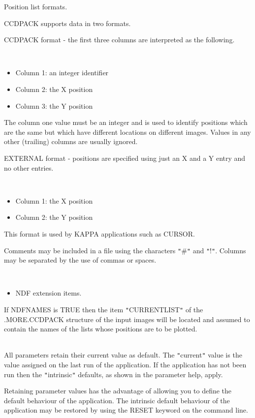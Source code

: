 \documentclass[twoside,11pt]{article}
\newcommand{\xref}[3]{#1}
\renewcommand{\_}{\texttt{\symbol{95}}}
\newcommand{\qt}[1]{{\tt "}#1{\tt "}}
\newcommand{\sstdiytopic}[2]{\item[#1:] \mbox{} \\[1.3ex] #2}
\newcommand{\sstitemlist}[1]{
  \mbox{} \\
  \vspace{-3.5ex}
  \begin{itemize}
     #1
  \end{itemize}
}
\newcommand{\sstitem}{\item}
\newcommand{\sstdiytopic}[2]{\item[{#1}] #2 }
\newcommand{\sstitemlist}[1]{
      \begin{itemize}
         #1
      \end{itemize}
      \\
   }
\newcommand{\sstitem}{\item}
\begin{document}
{{{         \sstitem
             Position list formats.

             CCDPACK supports data in two formats.

             CCDPACK format - the first three columns are interpreted as the
             following.

             \sstitemlist{

                \sstitem
                  Column 1: an integer identifier

                \sstitem
                  Column 2: the X position

                \sstitem
                  Column 3: the Y position
             }
             The column one value must be an integer and is used to identify
             positions which are the same but which have different locations
             on different images. Values in any other (trailing) columns are
             usually ignored.

             EXTERNAL format - positions are specified using just an X and
             a Y entry and no other entries.
             \sstitemlist{

                \sstitem
                  Column 1: the X position

                \sstitem
                  Column 2: the Y position

            }
            This format is used by KAPPA applications such as
            \xref{CURSOR}{sun95}{CURSOR}.

            Comments may be included in a file using the characters \qt{\#} and
            \qt{!}. Columns may be separated by the use of commas or spaces.

            \sstitemlist{

               \sstitem
                 NDF extension items.

           }
           If NDFNAMES is TRUE then the item \qt{CURRENT\_LIST} of the
           .MORE.CCDPACK structure of the input images will be located
           and assumed to contain the names of the lists whose positions
           are to be plotted.
     }
   }
   \sstdiytopic{
      Behaviour of parameters
   } {
      All parameters retain their current value as default. The
      \qt{current} value is the value assigned on the last run of the
      application. If the application has not been run then the
      \qt{intrinsic} defaults, as shown in the parameter help, apply.

      Retaining parameter values has the advantage of allowing you to
      define the default behaviour of the application. The intrinsic
      default behaviour of the application may be restored by using the
      RESET keyword on the command line.

}}
\end{document}
